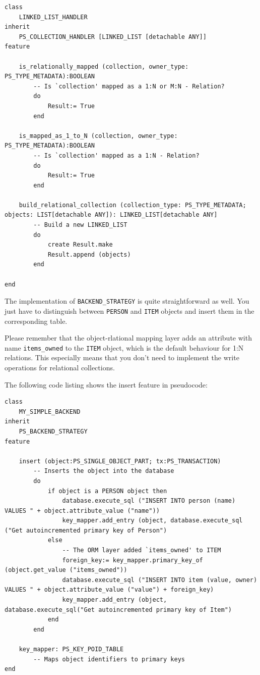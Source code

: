 \begin{lstlisting}[language=OOSC2Eiffel, captionpos=b, caption={The collection handler for LINKED\_LIST}, label={lst:my_linked_list_collection_handler}]
class 
	LINKED_LIST_HANDLER
inherit
	PS_COLLECTION_HANDLER [LINKED_LIST [detachable ANY]]
feature

	is_relationally_mapped (collection, owner_type: PS_TYPE_METADATA):BOOLEAN
		-- Is `collection' mapped as a 1:N or M:N - Relation?
		do
			Result:= True
		end

	is_mapped_as_1_to_N (collection, owner_type: PS_TYPE_METADATA):BOOLEAN
		-- Is `collection' mapped as a 1:N - Relation?
		do
			Result:= True
		end

	build_relational_collection (collection_type: PS_TYPE_METADATA; objects: LIST[detachable ANY]): LINKED_LIST[detachable ANY]
		-- Build a new LINKED_LIST
		do
			create Result.make
			Result.append (objects)
		end

end
\end{lstlisting}


The implementation of \lstinline!BACKEND_STRATEGY! is quite straightforward as well.
You just have to distinguish between \lstinline!PERSON! and \lstinline!ITEM! objects and insert them in the corresponding table.

Please remember that the object-rlational mapping layer adds an attribute with name \lstinline!items_owned! to the \lstinline!ITEM! object, which is the default behaviour for 1:N relations.
This especially means that you don't need to implement the write operations for relational collections.

The following code listing shows the insert feature in pseudocode:

\begin{lstlisting}[language=OOSC2Eiffel, captionpos=b, caption={The collection handler for LINKED\_LIST}, label={lst:my_backend_adaption}]
class 
	MY_SIMPLE_BACKEND
inherit
	PS_BACKEND_STRATEGY
feature

	insert (object:PS_SINGLE_OBJECT_PART; tx:PS_TRANSACTION)
		-- Inserts the object into the database
		do
			if object is a PERSON object then
				database.execute_sql ("INSERT INTO person (name) VALUES " + object.attribute_value ("name"))
				key_mapper.add_entry (object, database.execute_sql ("Get autoincremented primary key of Person")
			else
				-- The ORM layer added `items_owned' to ITEM
				foreign_key:= key_mapper.primary_key_of (object.get_value ("items_owned"))
				database.execute_sql ("INSERT INTO item (value, owner) VALUES " + object.attribute_value ("value") + foreign_key)
				key_mapper.add_entry (object, database.execute_sql("Get autoincremented primary key of Item")
			end
		end

	key_mapper: PS_KEY_POID_TABLE
		-- Maps object identifiers to primary keys
end
\end{lstlisting}

